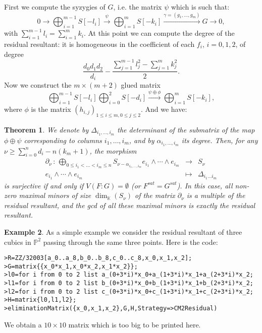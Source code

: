 \documentclass[10pt]{amsart}
\theoremstyle{plain}
\newtheorem{thm}{Theorem}[section]
\theoremstyle{definition}
\newtheorem{exmp}[thm]{Example}
\def\PP{{\mathbb{P}}}
\def\KK{{\mathbb{K}}}
\begin{document}
First we compute the syzygies of $G$, i.e. the matrix $\psi$ which is such that:
\begin{equation}\label{resG}
0 \rightarrow \bigoplus_{i=1}^{m-1}S[-l_i]  \xrightarrow{\psi} 
\bigoplus_{i=1}^{m}S[-k_i] \xrightarrow{\gamma=(g_1,\ldots,g_m)} G
\rightarrow 0,
\end{equation}
with $\sum_{i=1}^{m-1}l_i=\sum_{i=1}^{m}k_i$.
At this point we can compute the degree of the residual resultant: it is homogeneous in the
coefficient of each $f_i$, $i=0,1,2$, of degree
$$\frac{d_0d_1d_2}{d_i}-\frac{\sum_{j=1}^{m-1}l_j^2-\sum_{j=1}^{m}k_j^2}{2}.$$
Now we construct the $m\times (m+2)$ glued matrix
$$\bigoplus_{i=1}^{m-1}S[-l_i]\bigoplus_{i=0}^{2}S[-d_i]
\xrightarrow{\psi \oplus \phi} \bigoplus_{i=1}^{m}S[-k_i],$$
where
$\phi$ is the matrix $(h_{i,j})_{1\leq i \leq m, 0\leq j \leq 2}$. And we have:

\begin{thm} We denote by $\Delta_{i_1,\ldots,i_m}$ the determinant 
  of the submatrix of the map $\phi\oplus\psi$ corresponding to
  columns $i_1,\ldots,i_m$, and by $\alpha_{i_1,\ldots,i_m}$ its
  degree. Then, for any $\nu \geq \sum_{i=0}^{n}d_i-n(k_m+1)$, the
  morphism
\begin{eqnarray*}
 \partial_\nu \, : \,  \bigoplus_{0 \leq i_{1} < \ldots < i_{m} \leq n }
S_{\nu-\alpha_{i_1,\ldots,i_m}}e_{i_1}\wedge \cdots
\wedge e_{i_m}  &  \longrightarrow  & S_{\nu} \\
e_{i_1}\wedge \cdots \wedge e_{i_m}  & \mapsto & 
\Delta_{i_1\ldots i_m}
\end{eqnarray*}
is surjective if and only if $V(F:G)=\emptyset$ (or
$F^{sat}=G^{sat}$).  In this case, all non-zero maximal minors of size
$\dim_\KK(S_\nu)$ of the matrix $\partial_\nu $ is a multiple of
the residual resultant, and the gcd of all these maximal minors is
exactly the residual resultant.
\end{thm}

\begin{exmp}
 As a simple example we consider the residual resultant of three cubics in $\PP^2$ passing through the same three points. Here is the code:
\begin{verbatim}
>R=ZZ/32003[a_0..a_8,b_0..b_8,c_0..c_8,x_0,x_1,x_2]; 
>G=matrix{{x_0*x_1,x_0*x_2,x_1*x_2}}; 
>l0=for i from 0 to 2 list a_(0+3*i)*x_0+a_(1+3*i)*x_1+a_(2+3*i)*x_2;  
>l1=for i from 0 to 2 list b_(0+3*i)*x_0+b_(1+3*i)*x_1+b_(2+3*i)*x_2; 
>l2=for i from 0 to 2 list c_(0+3*i)*x_0+c_(1+3*i)*x_1+c_(2+3*i)*x_2; 
>H=matrix{l0,l1,l2}; 
>eliminationMatrix({x_0,x_1,x_2},G,H,Strategy=>CM2Residual)
\end{verbatim}
We obtain a $10\times 10$ matrix which is too big to be printed here.
\end{exmp}
\end{document}
